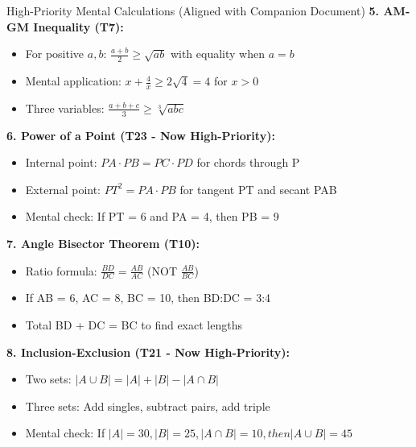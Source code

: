 \documentclass{article}
\begin{document}
\begin{mentalbox}{High-Priority Mental Calculations (Aligned with Companion Document)}
\textbf{5. AM-GM Inequality (T7):}
\begin{itemize}[nosep]
\item For positive $a,b$: $\frac{a+b}{2} \geq \sqrt{ab}$ with equality when $a=b$
\item Mental application: $x + \frac{4}{x} \geq 2\sqrt{4} = 4$ for $x > 0$
\item Three variables: $\frac{a+b+c}{3} \geq \sqrt[3]{abc}$
\end{itemize}

\textbf{6. Power of a Point (T23 - Now High-Priority):}
\begin{itemize}[nosep]
\item Internal point: $PA \cdot PB = PC \cdot PD$ for chords through P
\item External point: $PT^2 = PA \cdot PB$ for tangent PT and secant PAB
\item Mental check: If PT = 6 and PA = 4, then PB = 9
\end{itemize}

\textbf{7. Angle Bisector Theorem (T10):}
\begin{itemize}[nosep]
\item Ratio formula: $\frac{BD}{DC} = \frac{AB}{AC}$ (NOT $\frac{AB}{BC}$)
\item If AB = 6, AC = 8, BC = 10, then BD:DC = 3:4
\item Total BD + DC = BC to find exact lengths
\end{itemize}

\textbf{8. Inclusion-Exclusion (T21 - Now High-Priority):}
\begin{itemize}[nosep]
\item Two sets: $|A \cup B| = |A| + |B| - |A \cap B|$
\item Three sets: Add singles, subtract pairs, add triple
\item Mental check: If $|A| = 30, |B| = 25, |A\cap B| = 10, then |A\cup B| = 45$
\end{itemize}
\end{mentalbox}
\end{document}

